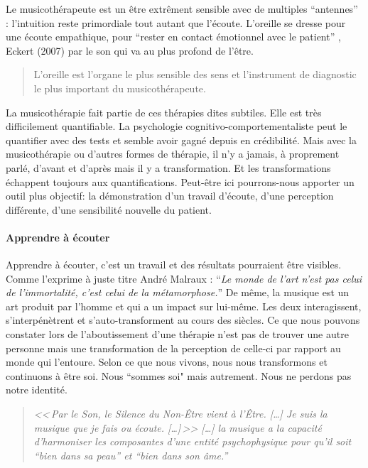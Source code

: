  Le musicothérapeute est un être extrêment sensible avec de multiples
 ``antennes'' : l'intuition reste primordiale tout autant que  
 l'écoute. L'oreille se dresse pour une écoute empathique, pour ``rester en contact émotionnel  
 avec le patient'' , Eckert (2007) par le son qui va au plus profond de
 l'être.

 
\begin{quotation}
	L'oreille est l'organe le plus sensible des sens 
et l'instrument de diagnostic  le plus important du
musicothérapeute.\autocite{seminar_zuerich}
 	
\end{quotation}
La musicothérapie fait partie de ces thérapies dites subtiles. Elle
est très difficilement quantifiable. La
psychologie cognitivo-comportementaliste peut le quantifier avec des tests et semble avoir gagné depuis en crédibilité. Mais avec la musicothérapie ou d'autres formes de thérapie, il n'y a
jamais, à proprement parlé, d'avant et d'après mais il y a transformation.
Et les transformations échappent toujours aux quantifications. Peut-être
ici pourrons-nous apporter un outil plus objectif: la démonstration d'un travail d'écoute, d'une perception
différente, d'une sensibilité nouvelle du patient. 



% 

\paragraph{Apprendre à écouter}

Apprendre à écouter,
c'est un travail et des résultats pourraient être visibles.
Comme l'exprime à juste titre André Malraux : \enquote{\emph{Le monde de
	l'art n'est pas celui de l'immortalité, c'est celui de la métamorphose.}}
De même, la musique est un art produit par l'homme et qui a un impact
sur lui-même. Les deux interagissent, s'interpénètrent et s'auto-transforment
au cours des siècles.
 Ce que nous pouvons constater lors de l'aboutissement
d'une thérapie n'est pas de trouver une autre personne mais une transformation
de la perception de celle-ci par rapport au monde qui l'entoure. 
Selon
ce que nous vivons, nous nous transformons et continuons à être
soi. Nous ``sommes soi" mais autrement. Nous ne perdons
pas notre identité.


\label{jeSuisLaMusique:viret}
\begin{quotation}
\emph{<<\,\emph{Par le Son, le Silence du Non-Être vient à l'Être}. [\dots] 
\textsl{Je suis}
	\emph{la musique que je fais ou écoute}. [\dots]\,>>
[\ldots] \emph{la musique a la capacité d'harmoniser
les composantes d'une entité psychophysique pour qu'il soit ``bien
dans sa peau'' et ``bien dans son âme.}''}\, \autocite[ch. 1,  p. 8]{viret:b}
\end{quotation}



